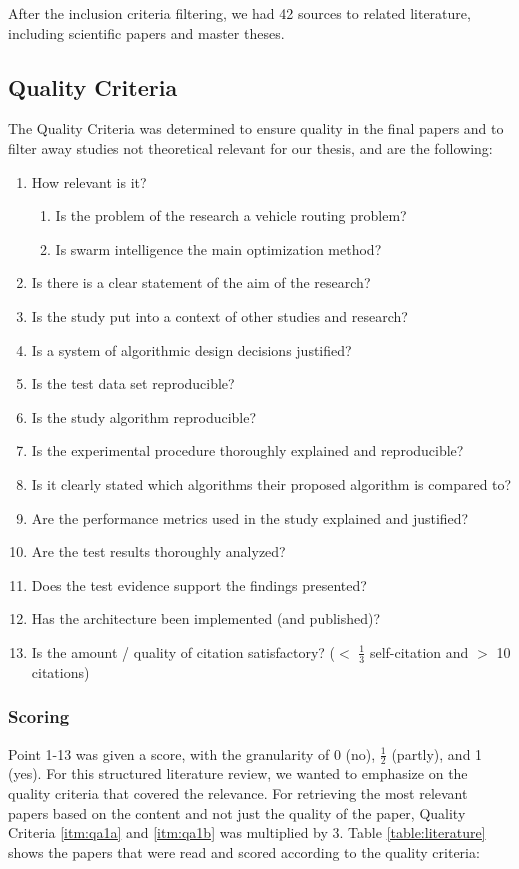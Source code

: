 After the inclusion criteria filtering, we had 42 sources to related literature, including scientific papers and master theses. 

\subsection{Quality Criteria} 
The Quality Criteria was determined to ensure quality in the final papers and to filter away studies not theoretical relevant for our thesis, and are the following:
\begin{enumerate}
\item \label{itm:qa1}How relevant is it?
\begin{enumerate}
\item \label{itm:qa1a}Is the problem of the research a vehicle routing problem?
\item \label{itm:qa1b}Is swarm intelligence the main optimization method? 
\end{enumerate}
\item Is there is a clear statement of the aim of the research?
\item Is the study put into a context of other studies and research?
\item Is a system of algorithmic design decisions justified?
\item Is the test data set reproducible?
\item Is the study algorithm reproducible?
\item Is the experimental procedure thoroughly explained and reproducible?
\item Is it clearly stated which algorithms their proposed algorithm is compared to?
\item Are the performance metrics used in the study explained and justified?
\item Are the test results thoroughly analyzed?
\item Does the test evidence support the findings presented?
\item Has the architecture been implemented (and published)?
\item Is the amount / quality of citation satisfactory? ($<$ $\frac{1}{3}$  self-citation and $>$ 10 citations)
\end{enumerate}

\subsubsection{Scoring}
Point 1-13 was given a score, with the granularity of 0 (no), $\frac{1}{2}$ (partly), and 1 (yes). For this structured literature review, we wanted to emphasize on the quality criteria that covered the relevance. For retrieving the most relevant papers based on the content and not just the quality of the paper, Quality Criteria \vref{itm:qa1a} and \vref{itm:qa1b} was multiplied by 3. Table \vref{table:literature} shows the papers that were read and scored according to the quality criteria: 

